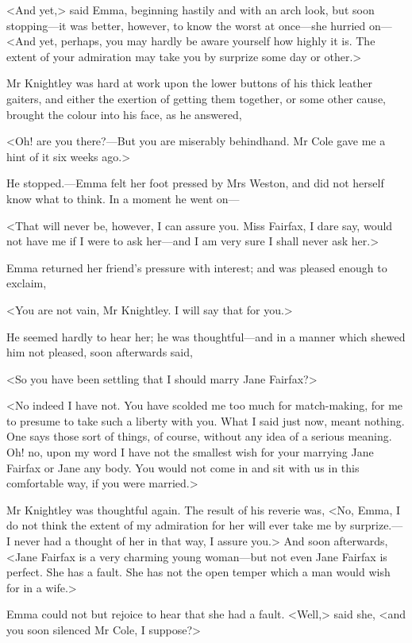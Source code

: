 <And yet,> said Emma, beginning hastily and with an arch look, but soon stopping—it was better, however, to know the worst at once—she hurried on—<And yet, perhaps, you may hardly be aware yourself how highly it is. The extent of your admiration may take you by surprize some day or other.>

Mr Knightley was hard at work upon the lower buttons of his thick leather gaiters, and either the exertion of getting them together, or some other cause, brought the colour into his face, as he answered,

<Oh! are you there?—But you are miserably behindhand. Mr Cole gave me a hint of it six weeks ago.>

He stopped.—Emma felt her foot pressed by Mrs Weston, and did not herself know what to think. In a moment he went on—

<That will never be, however, I can assure you. Miss Fairfax, I dare say, would not have me if I were to ask her—and I am very sure I shall never ask her.>

Emma returned her friend's pressure with interest; and was pleased enough to exclaim,

<You are not vain, Mr Knightley. I will say that for you.>

He seemed hardly to hear her; he was thoughtful—and in a manner which shewed him not pleased, soon afterwards said,

<So you have been settling that I should marry Jane Fairfax?>

<No indeed I have not. You have scolded me too much for match-making, for me to presume to take such a liberty with you. What I said just now, meant nothing. One says those sort of things, of course, without any idea of a serious meaning. Oh! no, upon my word I have not the smallest wish for your marrying Jane Fairfax or Jane any body. You would not come in and sit with us in this comfortable way, if you were married.>

Mr Knightley was thoughtful again. The result of his reverie was, <No, Emma, I do not think the extent of my admiration for her will ever take me by surprize.—I never had a thought of her in that way, I assure you.> And soon afterwards, <Jane Fairfax is a very charming young woman—but not even Jane Fairfax is perfect. She has a fault. She has not the open temper which a man would wish for in a wife.>

Emma could not but rejoice to hear that she had a fault. <Well,> said she, <and you soon silenced Mr Cole, I suppose?>

